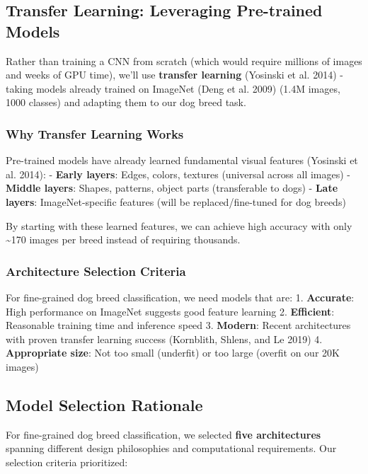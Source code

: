 \documentclass[
  letterpaper,
  DIV=11,
  numbers=noendperiod]{scrartcl}
\begin{document}
\subsection{Transfer Learning: Leveraging Pre-trained
Models}\label{transfer-learning-leveraging-pre-trained-models}

Rather than training a CNN from scratch (which would require millions of
images and weeks of GPU time), we'll use \textbf{transfer learning}
(Yosinski et al. 2014) - taking models already trained on ImageNet (Deng
et al. 2009) (1.4M images, 1000 classes) and adapting them to our dog
breed task.

\subsubsection{Why Transfer Learning
Works}\label{why-transfer-learning-works}

Pre-trained models have already learned fundamental visual features
(Yosinski et al. 2014): - \textbf{Early layers}: Edges, colors, textures
(universal across all images) - \textbf{Middle layers}: Shapes,
patterns, object parts (transferable to dogs) - \textbf{Late layers}:
ImageNet-specific features (will be replaced/fine-tuned for dog breeds)

By starting with these learned features, we can achieve high accuracy
with only \textasciitilde170 images per breed instead of requiring
thousands.

\subsubsection{Architecture Selection
Criteria}\label{architecture-selection-criteria}

For fine-grained dog breed classification, we need models that are: 1.
\textbf{Accurate}: High performance on ImageNet suggests good feature
learning 2. \textbf{Efficient}: Reasonable training time and inference
speed 3. \textbf{Modern}: Recent architectures with proven transfer
learning success (Kornblith, Shlens, and Le 2019) 4. \textbf{Appropriate
size}: Not too small (underfit) or too large (overfit on our 20K images)

\subsection{Model Selection Rationale}\label{model-selection-rationale}

For fine-grained dog breed classification, we selected \textbf{five
architectures} spanning different design philosophies and computational
requirements. Our selection criteria prioritized:
\end{document}
